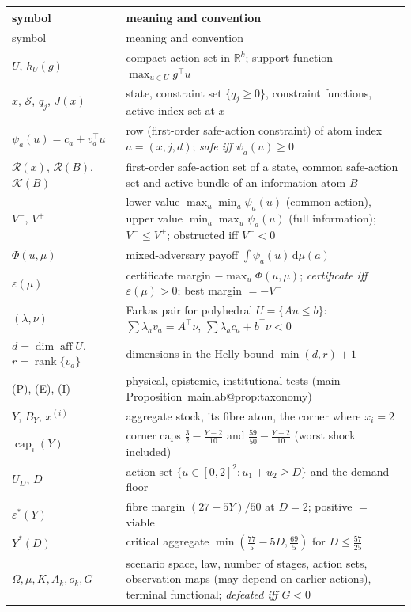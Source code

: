 \documentclass[11pt,a4paper]{article}
\makeatletter
\theoremstyle{plain}
\theoremstyle{definition}
\theoremstyle{remark}
\newcommand{\R}{\mathbb{R}}
\newcommand{\calK}{\mathcal{K}}
\newcommand{\calR}{\mathcal{R}}
\newcommand{\calS}{\mathcal{S}}
\newcommand{\aff}{\operatorname{aff}}
\newcommand{\rank}{\operatorname{rank}}
\newcommand{\capi}[1]{\operatorname{cap}_{#1}}
\newcommand{\tfr}[2]{\tfrac{#1}{#2}}
\newcommand{\dd}{\,\mathrm{d}}
\newcommand{\mref}[1]{\csname mainlab@#1\endcsname}
\makeatother
\begin{document}
\begin{footnotesize}
\begin{longtable}{p{3.0cm}p{11.6cm}}
\toprule
symbol & meaning and convention\\
\midrule
\endfirsthead
\toprule
symbol & meaning and convention\\
\midrule
\endhead
\bottomrule
\endlastfoot
$U$, $h_U(g)$ & compact action set in $\R^k$; support function $\max_{u\in U}g^\top u$ \\
$x$, $\calS$, $q_j$, $J(x)$ & state, constraint set $\{q_j\ge0\}$, constraint functions, active index set at $x$ \\
$\psi_a(u)=c_a+v_a^\top u$ & row (first-order safe-action constraint) of atom index $a=(x,j,d)$; \emph{safe iff $\psi_a(u)\ge0$} \\
$\calR(x)$, $\calR(B)$, $\calK(B)$ & first-order safe-action set of a state, common safe-action set and active bundle of an information atom $B$ \\
$V^-$, $V^+$ & lower value $\max_u\min_a\psi_a(u)$ (common action), upper value $\min_a\max_u\psi_a(u)$ (full information); $V^-\le V^+$; obstructed iff $V^-<0$ \\
$\Phi(u,\mu)$ & mixed-adversary payoff $\int\psi_a(u)\dd\mu(a)$ \\
$\varepsilon(\mu)$ & certificate margin $-\max_u\Phi(u,\mu)$; \emph{certificate iff $\varepsilon(\mu)>0$}; best margin $=-V^-$ \\
$(\lambda,\nu)$ & Farkas pair for polyhedral $U=\{Au\le b\}$: $\sum\lambda_av_a=A^\top\nu$, $\sum\lambda_ac_a+b^\top\nu<0$ \\
$d=\dim\aff U$, $r=\rank\{v_a\}$ & dimensions in the Helly bound $\min(d,r)+1$ \\
(P), (E), (I) & physical, epistemic, institutional tests (main Proposition~\mref{prop:taxonomy}) \\
$Y$, $B_Y$, $x^{(i)}$ & aggregate stock, its fibre atom, the corner where $x_i=2$ \\
$\capi{i}(Y)$ & corner caps $\tfr32-\tfr{Y-2}{10}$ and $\tfr{59}{50}-\tfr{Y-2}{10}$ (worst shock included) \\
$U_D$, $D$ & action set $\{u\in[0,2]^2:u_1+u_2\ge D\}$ and the demand floor \\
$\varepsilon^\ast(Y)$ & fibre margin $(27-5Y)/50$ at $D=2$; positive $=$ viable \\
$Y^\ast(D)$ & critical aggregate $\min(\tfr{77}5-5D,\tfr{69}5)$ for $D\le\tfr{57}{25}$ \\
$\Omega,\mu,K,A_k,o_k,G$ & scenario space, law, number of stages, action sets, observation maps (may depend on earlier actions), terminal functional; \emph{defeated iff $G<0$} \\

\end{longtable}
\end{footnotesize}
\end{document}
